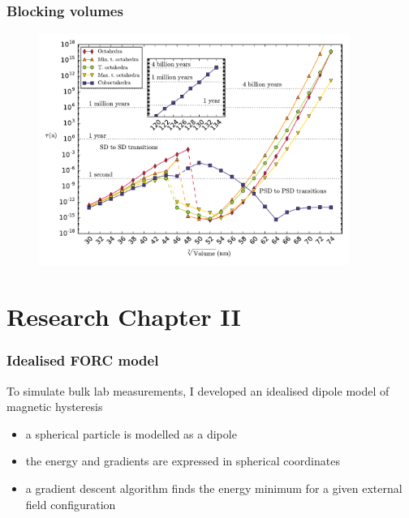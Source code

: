 \documentclass{beamer}
\begin{document}
                \begin{frame}
                  \frametitle{Blocking volumes}
                  \begin{figure}[htb]
                    \centering
                    \includegraphics[width=0.9\textwidth]{Chapter_01_Figure_09.pdf}
                  \end{figure}
                \end{frame}


        \section{Research Chapter II}
        \begin{frame}
          \frametitle{Idealised FORC model}
          To simulate bulk lab measurements, I developed an idealised dipole model of magnetic hysteresis
          \begin{itemize}
            \item a spherical particle is modelled as a dipole
            \item the energy and gradients are expressed in spherical coordinates
            \item a gradient descent algorithm finds the energy minimum for a given external field configuration
          \end{itemize}
        \end{frame}
\end{document}
